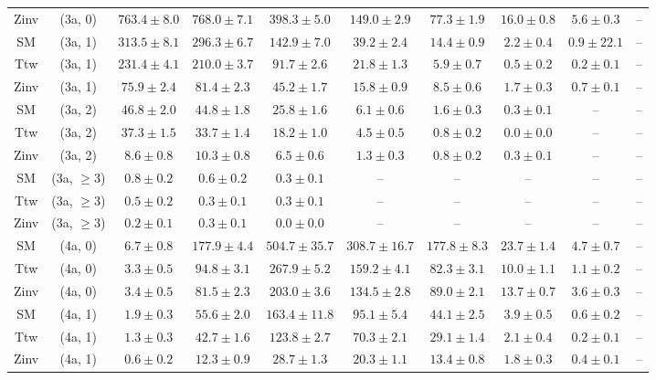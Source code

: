 \begin{table}[h!]
{\begin{tabular}{cccccccccc}
	Zinv & (3a, 0) & $763.4\pm 8.0$ & $768.0\pm 7.1$ & $398.3\pm 5.0$ & $149.0\pm 2.9$ & $77.3\pm 1.9$ & $16.0\pm 0.8$ & $5.6\pm 0.3$ & -- \\[0.5ex] 
	SM & (3a, 1) & $313.5\pm 8.1$ & $296.3\pm 6.7$ & $142.9\pm 7.0$ & $39.2\pm 2.4$ & $14.4\pm 0.9$ & $2.2\pm 0.4$ & $0.9\pm 22.1$ & -- \\[0.5ex] 
	Ttw & (3a, 1) & $231.4\pm 4.1$ & $210.0\pm 3.7$ & $91.7\pm 2.6$ & $21.8\pm 1.3$ & $5.9\pm 0.7$ & $0.5\pm 0.2$ & $0.2\pm 0.1$ & -- \\[0.5ex] 
	Zinv & (3a, 1) & $75.9\pm 2.4$ & $81.4\pm 2.3$ & $45.2\pm 1.7$ & $15.8\pm 0.9$ & $8.5\pm 0.6$ & $1.7\pm 0.3$ & $0.7\pm 0.1$ & -- \\[0.5ex] 
	SM & (3a, 2) & $46.8\pm 2.0$ & $44.8\pm 1.8$ & $25.8\pm 1.6$ & $6.1\pm 0.6$ & $1.6\pm 0.3$ & $0.3\pm 0.1$ & -- & -- \\[0.5ex] 
	Ttw & (3a, 2) & $37.3\pm 1.5$ & $33.7\pm 1.4$ & $18.2\pm 1.0$ & $4.5\pm 0.5$ & $0.8\pm 0.2$ & $0.0\pm 0.0$ & -- & -- \\[0.5ex] 
	Zinv & (3a, 2) & $8.6\pm 0.8$ & $10.3\pm 0.8$ & $6.5\pm 0.6$ & $1.3\pm 0.3$ & $0.8\pm 0.2$ & $0.3\pm 0.1$ & -- & -- \\[0.5ex] 
	SM & (3a, $\ge3$) & $0.8\pm 0.2$ & $0.6\pm 0.2$ & $0.3\pm 0.1$ & -- & -- & -- & -- & -- \\[0.5ex] 
	Ttw & (3a, $\ge3$) & $0.5\pm 0.2$ & $0.3\pm 0.1$ & $0.3\pm 0.1$ & -- & -- & -- & -- & -- \\[0.5ex] 
	Zinv & (3a, $\ge3$) & $0.2\pm 0.1$ & $0.3\pm 0.1$ & $0.0\pm 0.0$ & -- & -- & -- & -- & -- \\[0.5ex] 
	SM & (4a, 0) & $6.7\pm 0.8$ & $177.9\pm 4.4$ & $504.7\pm 35.7$ & $308.7\pm 16.7$ & $177.8\pm 8.3$ & $23.7\pm 1.4$ & $4.7\pm 0.7$ & -- \\[0.5ex] 
	Ttw & (4a, 0) & $3.3\pm 0.5$ & $94.8\pm 3.1$ & $267.9\pm 5.2$ & $159.2\pm 4.1$ & $82.3\pm 3.1$ & $10.0\pm 1.1$ & $1.1\pm 0.2$ & -- \\[0.5ex] 
	Zinv & (4a, 0) & $3.4\pm 0.5$ & $81.5\pm 2.3$ & $203.0\pm 3.6$ & $134.5\pm 2.8$ & $89.0\pm 2.1$ & $13.7\pm 0.7$ & $3.6\pm 0.3$ & -- \\[0.5ex] 
	SM & (4a, 1) & $1.9\pm 0.3$ & $55.6\pm 2.0$ & $163.4\pm 11.8$ & $95.1\pm 5.4$ & $44.1\pm 2.5$ & $3.9\pm 0.5$ & $0.6\pm 0.2$ & -- \\[0.5ex] 
	Ttw & (4a, 1) & $1.3\pm 0.3$ & $42.7\pm 1.6$ & $123.8\pm 2.7$ & $70.3\pm 2.1$ & $29.1\pm 1.4$ & $2.1\pm 0.4$ & $0.2\pm 0.1$ & -- \\[0.5ex] 
	Zinv & (4a, 1) & $0.6\pm 0.2$ & $12.3\pm 0.9$ & $28.7\pm 1.3$ & $20.3\pm 1.1$ & $13.4\pm 0.8$ & $1.8\pm 0.3$ & $0.4\pm 0.1$ & -- \\[0.5ex] 

\end{tabular}}
\end{table}
